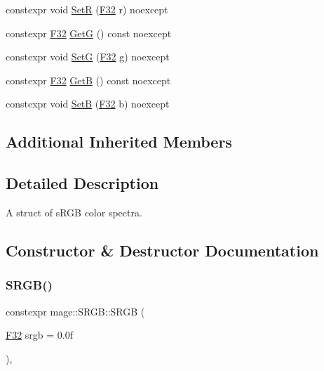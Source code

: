 \begin{DoxyCompactItemize}
\item 
constexpr void \mbox{\hyperlink{structmage_1_1_s_r_g_b_a0192829933892af3b9999653b7c976d2}{SetR}} (\mbox{\hyperlink{namespacemage_aa97e833b45f06d60a0a9c4fc22ae02c0}{F32}} r) noexcept
\item 
constexpr \mbox{\hyperlink{namespacemage_aa97e833b45f06d60a0a9c4fc22ae02c0}{F32}} \mbox{\hyperlink{structmage_1_1_s_r_g_b_a32cd65345a812c31b182d6ccaa47bab6}{GetG}} () const noexcept
\item 
constexpr void \mbox{\hyperlink{structmage_1_1_s_r_g_b_aba08d8f596cf38d8498fd9a5f5cfd998}{SetG}} (\mbox{\hyperlink{namespacemage_aa97e833b45f06d60a0a9c4fc22ae02c0}{F32}} g) noexcept
\item 
constexpr \mbox{\hyperlink{namespacemage_aa97e833b45f06d60a0a9c4fc22ae02c0}{F32}} \mbox{\hyperlink{structmage_1_1_s_r_g_b_afc01b8a11b3033ba21e6c5945359a421}{GetB}} () const noexcept
\item 
constexpr void \mbox{\hyperlink{structmage_1_1_s_r_g_b_a502751aa0c7b737c65c6cc5922cb0382}{SetB}} (\mbox{\hyperlink{namespacemage_aa97e833b45f06d60a0a9c4fc22ae02c0}{F32}} b) noexcept
\end{DoxyCompactItemize}
\subsection*{Additional Inherited Members}


\subsection{Detailed Description}
A struct of s\+R\+GB color spectra. 

\subsection{Constructor \& Destructor Documentation}
\mbox{\label{structmage_1_1_s_r_g_b_a5f1cc4d90aaa3801f1146eb767d45476}} 
\subsubsection{\texorpdfstring{S\+R\+G\+B()}{SRGB()}\hspace{0.1cm}{\footnotesize\ttfamily [1/6]}}
{\footnotesize\ttfamily constexpr mage\+::\+S\+R\+G\+B\+::\+S\+R\+GB (\begin{DoxyParamCaption}\item[{\mbox{\hyperlink{namespacemage_aa97e833b45f06d60a0a9c4fc22ae02c0}{F32}}}]{srgb = {\ttfamily 0.0f} }\end{DoxyParamCaption})\hspace{0.3cm}{\ttfamily [explicit]}, {\ttfamily [noexcept]}}

